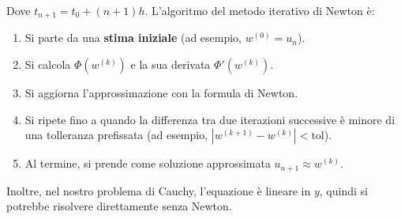 \begin{itemize}
\begin{enumerate}
\begin{equation*}
        \end{equation*}
        Dove $t_{n+1} = t_0 + (n+1) h$.
        L'algoritmo del metodo iterativo di Newton è:
        \begin{enumerate}
            \item Si parte da una \textbf{stima iniziale} (ad esempio, $w^{(0)} = u_n$).
            \item Si calcola $\Phi(w^{(k)})$ e la sua derivata $\Phi'(w^{(k)})$.
            \item Si aggiorna l'approssimazione con la formula di Newton.
            \item Si ripete fino a quando la differenza tra due iterazioni successive è minore di una tolleranza prefissata (ad esempio, $|w^{(k+1)} - w^{(k)}| < \text{tol}$).
            \item Al termine, si prende come soluzione approssimata $u_{n+1} \approx w^{(k)}$.
        \end{enumerate}
        Inoltre, nel nostro problema di Cauchy, l'equazione è lineare in $y$, quindi si potrebbe risolvere direttamente senza Newton.
    \end{enumerate}
\end{itemize}